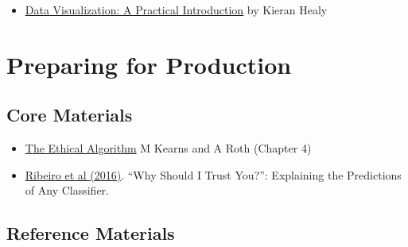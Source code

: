 \documentclass[
  12pt,
]{book}
\providecommand{\tightlist}{%
  \setlength{\itemsep}{0pt}\setlength{\parskip}{0pt}}
\begin{document}
\begin{itemize}
\tightlist
\item
  \href{https://library-search.imperial.ac.uk/discovery/fulldisplay?docid=alma991000211295101591\&context=L\&vid=44IMP_INST:ICL_VU1\&lang=en\&search_scope=MyInst_and_CI\&adaptor=Local\%20Search\%20Engine\&tab=Everything\&query=any,contains,Data\%20Visualization\%20\%E2\%80\%93\%20A\%20Practical\%20Introduction\&offset=0}{Data Visualization: A Practical Introduction} by Kieran Healy
\end{itemize}

\hypertarget{production-reading}{%
\section{Preparing for Production}\label{production-reading}}

\hypertarget{core-materials-3}{%
\subsection*{Core Materials}\label{core-materials-3}}

\begin{itemize}
\item
  \href{https://library-search.imperial.ac.uk/discovery/fulldisplay?docid=alma991000531083101591\&context=L\&vid=44IMP_INST:ICL_VU1\&lang=en\&search_scope=MyInst_and_CI\&adaptor=Local\%20Search\%20Engine\&tab=Everything\&query=any,contains,kearns\%20and\%20roth\&mode=Basic}{The Ethical Algorithm} M Kearns and A Roth (Chapter 4)
\item
  \href{https://arxiv.org/abs/1602.04938}{Ribeiro et al (2016)}. ``Why Should I Trust You?'': Explaining the Predictions of Any Classifier.
\end{itemize}

\hypertarget{reference-materials-2}{%
\subsection*{Reference Materials}\label{reference-materials-2}}
\end{document}
